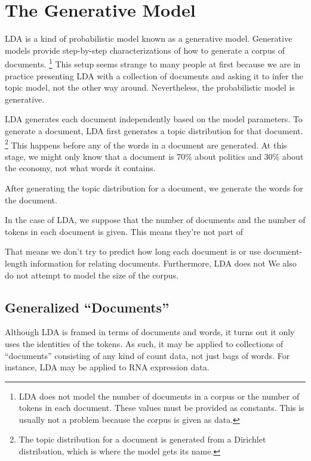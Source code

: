 \section{The Generative Model}

LDA is a kind of probabilistic model known as a generative model.
Generative models provide step-by-step characterizations of how to
generate a corpus of documents.%
%
\footnote{LDA does not model the number of documents in a corpus
or the number of tokens in each document.  These values must be
provided as constants.  This is usually not a problem because
the corpus is given as data.}
%
This setup seems strange to many people at first because we are in
practice presenting LDA with a collection of documents and asking it
to infer the topic model, not the other way around.  Nevertheless, the
probabilistic model is generative.

LDA generates each document independently based on the model
parameters.  To generate a document, LDA first generates a topic
distribution for that document.%
%
\footnote{The topic distribution for a document is generated from
a Dirichlet distribution, which is where the model gets its name.}
%
This happens before any of the words in a document are generated.  At
this stage, we might only know that a document is 70\% about politics
and 30\% about the economy, not what words it contains.

After generating the topic distribution for a document, we generate
the words for the document.  

In the case of LDA, we suppose that the number of documents and the
number of tokens in each document is given.  This means they're
not part of 

That means we don't try
to predict how long each document is or use document-length
information for relating documents.  Furthermore, LDA does not We also do not attempt to model
the size of the corpus.


\subsection{Generalized ``Documents''}

Although LDA is framed in terms of documents and words, it turns out
it only uses the identities of the tokens.  As such, it may be applied
to collections of ``documents'' consisting of any kind of count data,
not just bags of words.  For instance, LDA may be applied to RNA
expression data.

